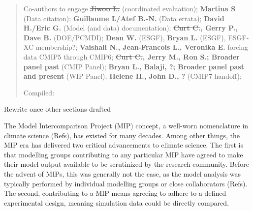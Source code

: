 \documentclass[gmd, preprint]{copernicus}
\def\cred#1{{\color{red}#1}}
\begin{document}
\begin{abstract}

\cred{
Co-authors to engage
\textbf{\sout{Jiwoo L.}} (coordinated evaluation); \textbf{Martina S} (Data citation); \textbf{Guillaume L/Atef B.-N.} (Data errata); \textbf{David H./Eric G.} (Model (and data) documentation); \textbf{\sout{Curt C.}, Gerry P., Dave B.} (DOE/PCMDI);
\textbf{Dean W.} (ESGF), \textbf{Bryan L.} (ESGF), ESGF-XC membership?;
\textbf{Vaishali N., Jean-Francois L., Veronika E.} forcing data CMIP5 through CMIP6;
\textbf{\sout{Curt C.}, Jerry M., Ron S.; Broader panel past} (CMIP Panel);
\textbf{Bryan L., Balaji, ?; Broader panel past and present} (WIP Panel);
\textbf{Helene H., John D., ?} (CMIP7 handoff);
}

{Compiled: \DTMnow}

\end{abstract}



\introduction  %
\cred{Rewrite once other sections drafted}

The Model Intercomparison Project (MIP) concept, a well-worn nomenclature in climate science \cred{(Refs)}, has existed for many decades. Among other things, the MIP era has delivered two critical advancements to climate science. The first is that modelling groups contributing to any particular MIP have agreed to make their model output available to be scrutinized by the research community. Before the advent of MIPs, this was generally not the case, as the model analysis was typically performed by individual modelling groups or close collaborators \cred{(Refs)}. The second, contributing to a MIP means agreeing to adhere to a defined experimental design, meaning simulation data could be directly compared.
\end{document}
